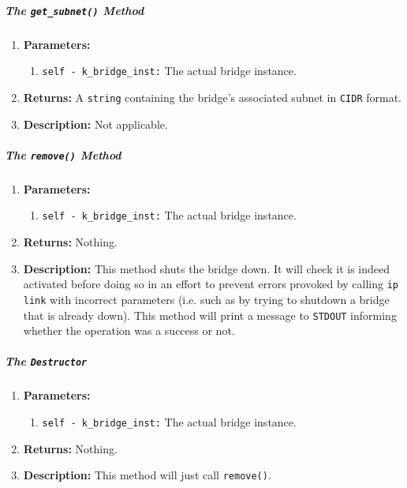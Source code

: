                     \subparagraph{The \texttt{get\_subnet()} Method}
                        \begin{enumerate}
                            \item \textbf{Parameters:}
                            \begin{enumerate}
                                \item \texttt{self - k\_bridge\_inst:} The actual bridge instance.
                            \end{enumerate}
                            \item \textbf{Returns:} A \texttt{string} containing the bridge's associated subnet in \texttt{CIDR} format.
                            \item \textbf{Description:} Not applicable.
                        \end{enumerate}

                    \subparagraph{The \texttt{remove()} Method}
                        \begin{enumerate}
                            \item \textbf{Parameters:}
                            \begin{enumerate}
                                \item \texttt{self - k\_bridge\_inst:} The actual bridge instance.
                            \end{enumerate}
                            \item \textbf{Returns:} Nothing.
                            \item \textbf{Description:} This method shuts the bridge down. It will check it is indeed activated before doing so in an effort to prevent errors provoked by calling \texttt{ip link} with incorrect parameters (i.e. such as by trying to shutdown a bridge that is already down). This method will print a message to \texttt{STDOUT} informing whether the operation was a success or not.
                        \end{enumerate}

                    \subparagraph{The \texttt{Destructor}}
                        \begin{enumerate}
                            \item \textbf{Parameters:}
                            \begin{enumerate}
                                \item \texttt{self - k\_bridge\_inst:} The actual bridge instance.
                            \end{enumerate}
                            \item \textbf{Returns:} Nothing.
                            \item \textbf{Description:} This method will just call \texttt{remove()}.
                        \end{enumerate}

